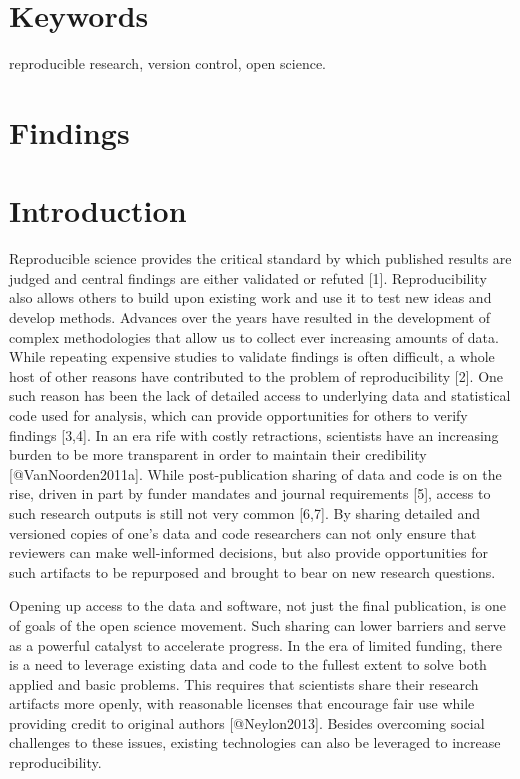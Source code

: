 \documentclass[]{article}
\begin{document}
\section{Keywords}

reproducible research, version control, open science. \newpage

\section{Findings}

\section{Introduction}

Reproducible science provides the critical standard by which published
results are judged and central findings are either validated or refuted
{[}1{]}. Reproducibility also allows others to build upon existing work
and use it to test new ideas and develop methods. Advances over the
years have resulted in the development of complex methodologies that
allow us to collect ever increasing amounts of data. While repeating
expensive studies to validate findings is often difficult, a whole host
of other reasons have contributed to the problem of reproducibility
{[}2{]}. One such reason has been the lack of detailed access to
underlying data and statistical code used for analysis, which can
provide opportunities for others to verify findings {[}3,4{]}. In an era
rife with costly retractions, scientists have an increasing burden to be
more transparent in order to maintain their credibility
{[}@VanNoorden2011a{]}. While post-publication sharing of data and code
is on the rise, driven in part by funder mandates and journal
requirements {[}5{]}, access to such research outputs is still not very
common {[}6,7{]}. By sharing detailed and versioned copies of one's data
and code researchers can not only ensure that reviewers can make
well-informed decisions, but also provide opportunities for such
artifacts to be repurposed and brought to bear on new research
questions.

Opening up access to the data and software, not just the final
publication, is one of goals of the open science movement. Such sharing
can lower barriers and serve as a powerful catalyst to accelerate
progress. In the era of limited funding, there is a need to leverage
existing data and code to the fullest extent to solve both applied and
basic problems. This requires that scientists share their research
artifacts more openly, with reasonable licenses that encourage fair use
while providing credit to original authors {[}@Neylon2013{]}. Besides
overcoming social challenges to these issues, existing technologies can
also be leveraged to increase reproducibility.
\end{document}
